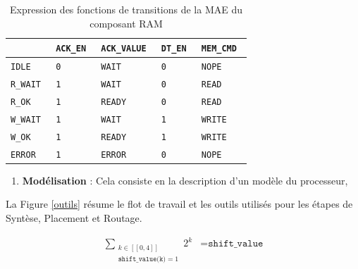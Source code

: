 \documentclass{article}
\begin{document}
\begin{table}[H]
\centering
\begingroup
\setlength{\tabcolsep}{5pt}
\renewcommand{\arraystretch}{1.1}
\begin{tabular}{| l | l | l | l | l |}
\hline
                    & \tt{ACK\_EN}      & \tt{ACK\_VALUE}   & \tt{DT\_EN} & \tt{MEM\_CMD}   \\
\hline
\tt{IDLE}           & \tt{0}            & \tt{WAIT}         & \tt{0}      & \tt{NOPE}         \\
\tt{R\_WAIT}        & \tt{1}            & \tt{WAIT}         & \tt{0}      & \tt{READ}         \\
\tt{R\_OK}          & \tt{1}            & \tt{READY}        & \tt{0}      & \tt{READ}         \\
\tt{W\_WAIT}        & \tt{1}            & \tt{WAIT}         & \tt{1}      & \tt{WRITE}        \\
\tt{W\_OK}          & \tt{1}            & \tt{READY}        & \tt{1}      & \tt{WRITE}        \\
\tt{ERROR}          & \tt{1}            & \tt{ERROR}        & \tt{0}      & \tt{NOPE}         \\
\hline
\end{tabular}
\endgroup
\caption{Expression des fonctions de transitions de la MAE du composant RAM}
\label{standard}
\end{table}







\begin{enumerate}
\item \textbf{Modélisation}  : Cela consiste en la description d'un modèle du processeur,
\end{enumerate}

La Figure \ref{outils} résume le flot de travail et les outils utilisés pour les étapes de Syntèse,
Placement et Routage.

\begin{eqnarray*}
  \sum_{\substack{k \in [[0, 4]] \\ \texttt{shift\_value(k)} = 1}} 2^k &= \texttt{shift\_value}
\end{eqnarray*}

%

\end{document}
